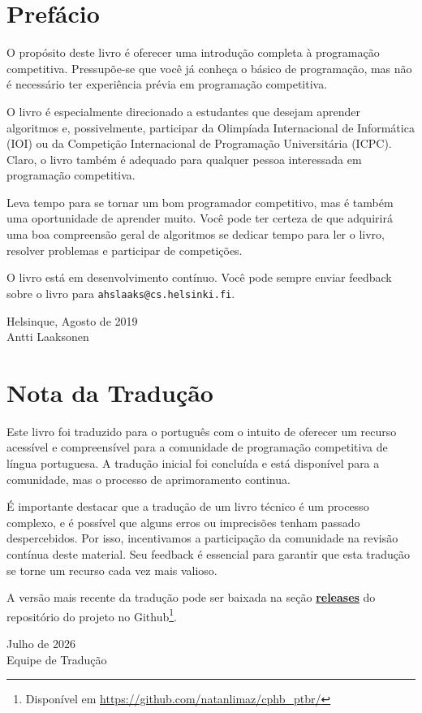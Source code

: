 \chapter*{Prefácio}

O propósito deste livro é oferecer uma introdução completa à programação competitiva. Pressupõe-se que você já conheça o básico de programação, mas não é necessário ter experiência prévia em programação competitiva.

O livro é especialmente direcionado a estudantes que desejam aprender algoritmos e, possivelmente, participar da Olimpíada Internacional de Informática (IOI) ou da Competição Internacional de Programação Universitária (ICPC). Claro, o livro também é adequado para qualquer pessoa interessada em programação competitiva.

Leva tempo para se tornar um bom programador competitivo, mas é também uma oportunidade de aprender muito. Você pode ter certeza de que adquirirá uma boa compreensão geral de algoritmos se dedicar tempo para ler o livro, resolver problemas e participar de competições.

O livro está em desenvolvimento contínuo. Você pode sempre enviar feedback sobre o livro para \texttt{ahslaaks@cs.helsinki.fi}.

\begin{flushright}
Helsinque, Agosto de 2019 \\
Antti Laaksonen
\end{flushright}

\chapter*{Nota da Tradução}

Este livro foi traduzido para o português com o intuito de oferecer um recurso acessível e compreensível para a comunidade de programação competitiva de língua portuguesa. A tradução inicial foi concluída e está disponível para a comunidade, mas o processo de aprimoramento continua.

É importante destacar que a tradução de um livro técnico é um processo complexo, e é possível que alguns erros ou imprecisões tenham passado despercebidos. Por isso, incentivamos a participação da comunidade na revisão contínua deste material. Seu feedback é essencial para garantir que esta tradução se torne um recurso cada vez mais valioso.

A versão mais recente da tradução pode ser baixada na seção \href{https://github.com/natanlimaz/cphb_ptbr/releases}{\textbf{releases}} do repositório do projeto no Github\footnote{Disponível em \url{https://github.com/natanlimaz/cphb_ptbr/}}.

\bigskip

\begin{flushright}
Julho de 2026 \\
Equipe de Tradução
\end{flushright}
